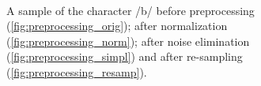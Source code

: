 \begin{figure}
	\centering
          \\
    \caption{A sample of the character  /b/ before preprocessing (\ref{fig:preprocessing_orig}); after normalization (\ref{fig:preprocessing_norm}); after noise elimination (\ref{fig:preprocessing_simpl}) and after re-sampling (\ref{fig:preprocessing_resamp}).}
   \label{fig:before_after_preprocessing}
\end{figure}


